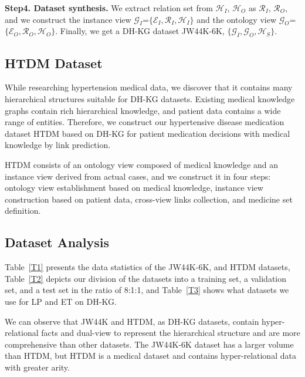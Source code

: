 \documentclass[letterpaper]{article} \usepackage{aaai23}  \usepackage{times}  \usepackage{helvet}  \usepackage{courier}  \usepackage[hyphens]{url}  \usepackage{graphicx} \urlstyle{rm} \def\UrlFont{\rm}  \usepackage{natbib}  \usepackage{caption} \frenchspacing  \setlength{\pdfpagewidth}{8.5in}  \setlength{\pdfpageheight}{11in}  \usepackage{times}
\begin{document}
\textbf{Step4. Dataset synthesis.} 
We extract relation set from $\mathcal{H}_I$, $\mathcal{H}_O$ as $\mathcal{R}_I$, $\mathcal{R}_O$, and we construct the instance view  $\mathcal{G}_I$=$\{\mathcal{E}_I, \mathcal{R}_I, \mathcal{H}_I\}$ and the ontology view $\mathcal{G}_O$=$\{\mathcal{E}_O, \mathcal{R}_O, \mathcal{H}_O\}$. Finally, we get a DH-KG dataset JW44K-6K, $\{\mathcal{G}_I,\mathcal{G}_O,\mathcal{H}_S\}$.









\subsection{HTDM Dataset}
While researching hypertension medical data, we discover that it contains many hierarchical structures suitable for DH-KG datasets. Existing medical knowledge graphs contain rich hierarchical knowledge, and patient data contains a wide range of entities. Therefore, we construct our hypertensive disease medication dataset HTDM based on DH-KG for patient medication decisions with medical knowledge by link prediction.

HTDM consists of an ontology view composed of medical knowledge and an instance view derived from actual cases, and we construct it in four steps: ontology view establishment based on medical knowledge, instance view construction based on patient data, cross-view links collection, and medicine set definition. 






\subsection{Dataset Analysis}

Table~\ref{T1} presents the data statistics of the JW44K-6K, and HTDM datasets, Table~\ref{T2} depicts our division of the datasets into a training set, a validation set, and a test set in the ratio of 8:1:1,  and Table~\ref{T3} shows what datasets we use for LP and ET on DH-KG.

We can observe that JW44K and HTDM, as DH-KG datasets, contain hyper-relational facts and dual-view to represent the hierarchical structure and are more comprehensive than other datasets. The JW44K-6K dataset has a larger volume than HTDM, but HTDM is a medical dataset and contains hyper-relational data with greater arity.
\end{document}
